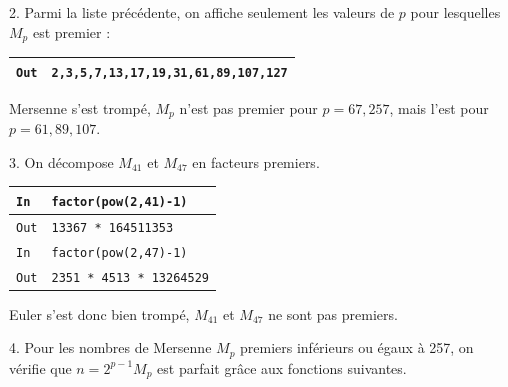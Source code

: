\documentclass[titlepage]{article}
\begin{document}
    

    2. Parmi la liste précédente, on affiche seulement les valeurs de $p$ pour lesquelles $M_p$ est premier :

    

    \begin{tabularx}{12cm}{|p{0.60cm}|X|}
        \hline
        \texttt{Out}
        &
        \texttt{2,3,5,7,13,17,19,31,61,89,107,127}
        \\
        \hline
    \end{tabularx}
    \bigbreak

    Mersenne s'est trompé, $M_p$ n'est pas premier pour $p = 67, 257$, mais l'est pour $p = 61, 89, 107$.\bigbreak

    3. On décompose $M_{41}$ et $M_{47}$ en facteurs premiers.\bigbreak

    \begin{tabularx}{12cm}{|p{0.60cm}|X|}
        \hline
        \rowcolor{gray}
        \texttt{In}
        & 
        \texttt{factor(pow(2,41)-1)}
        \\
        \hline
        \texttt{Out}
        &
        \texttt{13367 * 164511353}
        \\
        \hline
        \rowcolor{gray}
        \texttt{In}
        & 
        \texttt{factor(pow(2,47)-1)}
        \\
        \hline
        \texttt{Out}
        &
        \texttt{2351 * 4513 * 13264529}
        \\
        \hline
    \end{tabularx}
    \bigbreak

    Euler s'est donc bien trompé, $M_{41}$ et $M_{47}$ ne sont pas premiers.\bigbreak

    4. Pour les nombres de Mersenne $M_p$ premiers inférieurs ou égaux à 257, on vérifie que $n = 2^{p-1}M_p$ est parfait grâce aux fonctions suivantes.
    
\end{document}

